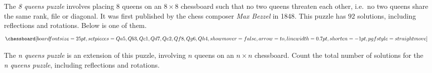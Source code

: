 
\problem The {\em 8 queens puzzle} involves placing $8$ queens on an $8 \times 8$ chessboard such that no two queens
threaten each other, i.e.\ no two queens share the same rank, file or diagonal. It was first published by the chess
composer {\it Max Bezzel} in 1848. This puzzle has $92$ solutions, including reflections and rotations.
Below is one of them.
\[\chessboard[boardfontsize=25pt,
			  setpieces={Qa5, Qb3, Qc1, Qd7, Qe2, Qf8, Qg6, Qh4},
			  showmover=false,
			  arrow=to, linewidth=0.7pt, shorten=-1pt,
			  pgfstyle=straightmove]\]

The {\em n queens puzzle} is an extension of this puzzle, involving $n$ queens on an $n \times n$ chessboard.
Count the total number of solutions for the {\em n queens puzzle}, including reflections and rotations.

